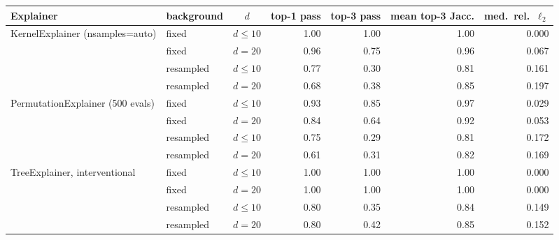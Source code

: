 \begin{tabular}{llcrrrr}
\toprule
Explainer & background & $d$ & top-1 pass & top-3 pass & mean top-3 Jacc. & med.\ rel.\ $\ell_2$\\
\midrule
KernelExplainer (nsamples=auto) & fixed & $d\le 10$ & 1.00 & 1.00 & 1.00 & 0.000\\
 & fixed & $d=20$ & 0.96 & 0.75 & 0.96 & 0.067\\
 & resampled & $d\le 10$ & 0.77 & 0.30 & 0.81 & 0.161\\
 & resampled & $d=20$ & 0.68 & 0.38 & 0.85 & 0.197\\
\midrule
PermutationExplainer (500 evals) & fixed & $d\le 10$ & 0.93 & 0.85 & 0.97 & 0.029\\
 & fixed & $d=20$ & 0.84 & 0.64 & 0.92 & 0.053\\
 & resampled & $d\le 10$ & 0.75 & 0.29 & 0.81 & 0.172\\
 & resampled & $d=20$ & 0.61 & 0.31 & 0.82 & 0.169\\
\midrule
TreeExplainer, interventional & fixed & $d\le 10$ & 1.00 & 1.00 & 1.00 & 0.000\\
 & fixed & $d=20$ & 1.00 & 1.00 & 1.00 & 0.000\\
 & resampled & $d\le 10$ & 0.80 & 0.35 & 0.84 & 0.149\\
 & resampled & $d=20$ & 0.80 & 0.42 & 0.85 & 0.152\\
\bottomrule
\end{tabular}
